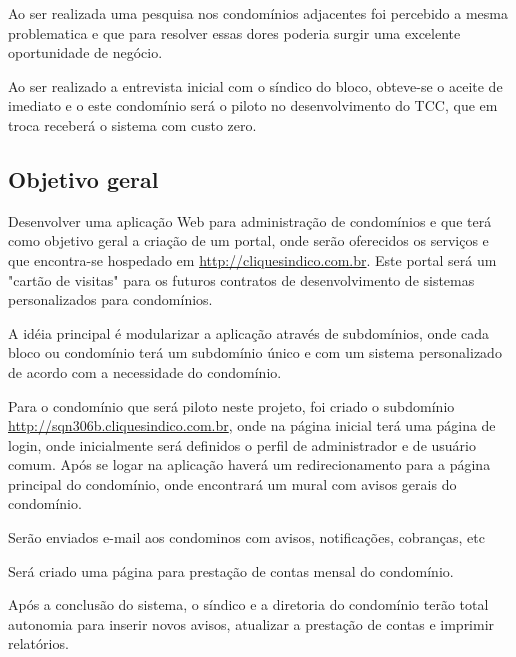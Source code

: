 Ao ser realizada uma pesquisa nos condomínios adjacentes foi percebido a mesma
problematica e que para resolver essas dores poderia surgir uma excelente
oportunidade de negócio.

Ao ser realizado a entrevista inicial com o síndico do bloco, obteve-se o
aceite de imediato e o este condomínio será o piloto no desenvolvimento
do TCC, que em troca receberá o sistema com custo zero.

\subsection{Objetivo geral}
Desenvolver uma aplicação Web para administração de condomínios e que
terá como objetivo geral a criação de um portal, onde serão oferecidos
os serviços e que encontra-se hospedado em \url{http://cliquesindico.com.br}.
Este portal será um "cartão de visitas" para os futuros contratos de
desenvolvimento de sistemas personalizados para condomínios.

A idéia principal é modularizar a aplicação através de subdomínios, onde cada 
bloco ou condomínio terá um subdomínio único e com um sistema personalizado
de acordo com a necessidade do condomínio.

Para o condomínio que será piloto neste projeto, foi criado o subdomínio
\url{http://sqn306b.cliquesindico.com.br}, onde na página inicial terá uma página
de login, onde inicialmente será definidos o perfil de administrador e de usuário
comum. Após se logar na aplicação haverá um redirecionamento para a página
principal do condomínio, onde encontrará um mural com avisos gerais do condomínio.

Serão enviados e-mail aos condominos com avisos, notificações, cobranças, etc

Será criado uma página para prestação de contas mensal do condomínio.

Após a conclusão do sistema, o síndico e a diretoria do condomínio terão total
autonomia para inserir novos avisos, atualizar a prestação de contas e imprimir
relatórios.


